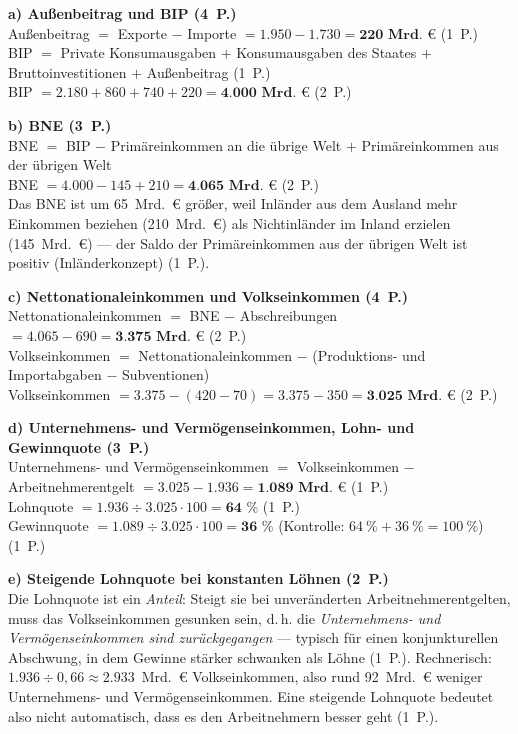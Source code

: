 \begin{loesung}[title={Lösung Aufgabe~2.6 --- VGR: Vom BIP zum Volkseinkommen}]
\textbf{a) Außenbeitrag und BIP (4~P.)}\\
Außenbeitrag $=$ Exporte $-$ Importe $= 1.950 - 1.730 = \textbf{220~Mrd.~€}$ (1~P.)\\
BIP $=$ Private Konsumausgaben $+$ Konsumausgaben des Staates $+$ Bruttoinvestitionen
$+$ Außenbeitrag (1~P.)\\
BIP $= 2.180 + 860 + 740 + 220 = \textbf{4.000~Mrd.~€}$ (2~P.)

\textbf{b) BNE (3~P.)}\\
BNE $=$ BIP $-$ Primäreinkommen an die übrige Welt $+$ Primäreinkommen aus der übrigen Welt\\
BNE $= 4.000 - 145 + 210 = \textbf{4.065~Mrd.~€}$ (2~P.)\\
Das BNE ist um 65~Mrd.~€ größer, weil Inländer aus dem Ausland mehr Einkommen beziehen
(210~Mrd.~€) als Nichtinländer im Inland erzielen (145~Mrd.~€) --- der Saldo der
Primäreinkommen aus der übrigen Welt ist positiv (Inländerkonzept) (1~P.).

\textbf{c) Nettonationaleinkommen und Volkseinkommen (4~P.)}\\
Nettonationaleinkommen $=$ BNE $-$ Abschreibungen $= 4.065 - 690 =
\textbf{3.375~Mrd.~€}$ (2~P.)\\
Volkseinkommen $=$ Nettonationaleinkommen $-$ (Produktions- und Importabgaben $-$
Subventionen)\\
Volkseinkommen $= 3.375 - (420 - 70) = 3.375 - 350 = \textbf{3.025~Mrd.~€}$ (2~P.)

\textbf{d) Unternehmens- und Vermögenseinkommen, Lohn- und Gewinnquote (3~P.)}\\
Unternehmens- und Vermögenseinkommen $=$ Volkseinkommen $-$ Arbeitnehmerentgelt
$= 3.025 - 1.936 = \textbf{1.089~Mrd.~€}$ (1~P.)\\
Lohnquote $= 1.936 \div 3.025 \cdot 100 = \textbf{64~\%}$ (1~P.)\\
Gewinnquote $= 1.089 \div 3.025 \cdot 100 = \textbf{36~\%}$
(Kontrolle: $64~\% + 36~\% = 100~\%$) (1~P.)

\textbf{e) Steigende Lohnquote bei konstanten Löhnen (2~P.)}\\
Die Lohnquote ist ein \emph{Anteil}: Steigt sie bei unveränderten Arbeitnehmerentgelten,
muss das Volkseinkommen gesunken sein, d.\,h. die \emph{Unternehmens- und
Vermögenseinkommen sind zurückgegangen} --- typisch für einen konjunkturellen Abschwung,
in dem Gewinne stärker schwanken als Löhne (1~P.). Rechnerisch: $1.936 \div 0{,}66
\approx 2.933$~Mrd.~€ Volkseinkommen, also rund 92~Mrd.~€ weniger Unternehmens- und
Vermögenseinkommen. Eine steigende Lohnquote bedeutet also nicht automatisch, dass es
den Arbeitnehmern besser geht (1~P.).
\end{loesung}

